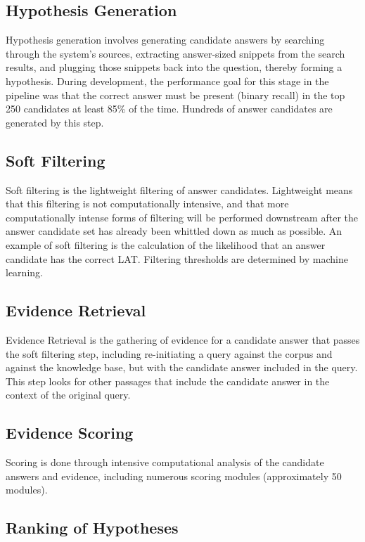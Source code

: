 \subsection{Hypothesis Generation}

Hypothesis generation involves generating candidate answers by searching through the system’s sources, extracting answer-sized snippets from the search results, and plugging those snippets back into the question, thereby forming a hypothesis.  During development, the performance goal for this stage in the pipeline was that the correct answer must be present (binary recall) in the top 250 candidates at least 85\% of the time.  Hundreds of answer candidates are generated by this step.

\subsection{Soft Filtering}

Soft filtering is the lightweight filtering of answer candidates.  Lightweight means that this filtering is not computationally intensive, and that more computationally intense forms of filtering will be performed downstream after the answer candidate set has already been whittled down as much as possible.  An example of soft filtering is the calculation of the likelihood that an answer candidate has the correct LAT.  Filtering thresholds are determined by machine learning.

\subsection{Evidence Retrieval}

Evidence Retrieval is the gathering of evidence for a candidate answer that passes the soft filtering step, including re-initiating a query against the corpus and against the knowledge base, but with the candidate answer included in the query.  This step looks for other passages that include the candidate answer in the context of the original query.

\subsection{Evidence Scoring}

Scoring is done through intensive computational analysis of the candidate answers and evidence, including numerous scoring modules (approximately 50 modules).

\subsection{Ranking of Hypotheses}

